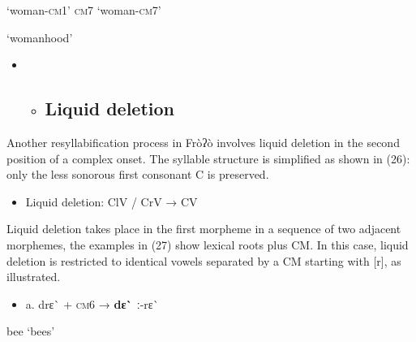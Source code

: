\begin{styleindexi}
          ‘woman-\textsc{cm}1’               \textsc{cm}7                                        ‘woman-\textsc{cm}7’
\end{styleindexi}

\begin{styleindexi}
                                                                                  ‘womanhood’  
\end{styleindexi}

\begin{itemize}
\item \begin{itemize}
\item \subsection{ Liquid deletion} \end{itemize}
\end{itemize}

Another resyllabification process in Fròʔò involves liquid deletion in the second position of a complex onset. The syllable structure is simplified as shown in (26): only the less sonorous first consonant C is preserved.

\begin{itemize}
\item \begin{styleindexi}
 \label{bkm:Ref486616730}Liquid deletion: ClV / CrV → CV
\end{styleindexi}\end{itemize}

Liquid deletion takes place in the first morpheme in a sequence of two adjacent morphemes, the examples in (27) show lexical roots plus CM. In this case, liquid deletion is restricted to identical vowels separated by a CM starting with [r], as illustrated.

\begin{itemize}
\item \begin{styleindexi}
  \label{bkm:Ref500059531}a.   drɛ\`{}                +        \textsc{cm}6                      →          \textbf{dɛ\`{} ː}{}-rɛ\`{}               
\end{styleindexi}\end{itemize}
\begin{styleindexi}
              bee                                                            ‘bees’
\end{styleindexi}

